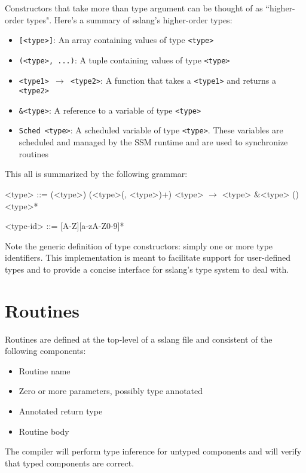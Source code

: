 \documentclass{article}
\begin{document}
\noindent Constructors that take more than type argument can be thought of as ``higher-order types". Here's a summary of sslang's higher-order types:
\begin{itemize}
    \item \texttt{[<type>]}: An array containing values of type \texttt{<type>}
    \item \texttt{(<type>, ...)}: A tuple containing values of type \texttt{<type>}
    \item \texttt{<type1> $\rightarrow$ <type2>}: A function that takes a   \texttt{<type1>} and returns a  \texttt{<type2>}
    \item \texttt{\&<type>}: A reference to a variable of type \texttt{<type>}
    \item \texttt{Sched <type>}: A scheduled variable of type \texttt{<type>}. These variables are scheduled and managed by the SSM runtime and are used to synchronize routines
\end{itemize}

\noindent This all is summarized by the following grammar:
\setlength{\grammarindent}{5em}
\begin{grammar}
<type> ::= (<type>)
\alt [<type>]
\alt (<type>(, <type>)+)
\alt <type> $\rightarrow$ <type>
\alt \&<type>
\alt ()
 <type>*

<type-id> ::= [A-Z][a-zA-Z0-9]* 
\end{grammar}

\noindent Note the generic definition of type constructors: simply one or more type identifiers. This implementation is meant to facilitate support for user-defined types and to provide a concise interface for sslang's type system to deal with.
\section{Routines}
\noindent Routines are defined at the top-level of a sslang file and consistent of the following components:
\begin{itemize}
    \item Routine name
    \item Zero or more parameters, possibly type annotated
    \item Annotated return type
    \item Routine body
\end{itemize}
\noindent The compiler will perform type inference for untyped components and will verify that typed components are correct.
\end{document}
